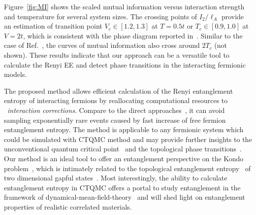 \documentclass[12pt,onecolumn,english,prl,showpacs,nofootinbib]{revtex4-1}
\begin{document}
Figure~\ref{fig:MI} shows the scaled mutual information versus interaction strength and temperature for several system sizes. The crossing points of $I_{2}/\ell_{A}$ provide an estimation of transition point $V_{c}\in[1.2, 1.3]$ at $T=0.5t$ or $T_{c}\in[0.9, 1.0]$ at $V=2t$, which is consistent with the phase diagram reported in~\cite{Gubernatis:1985wo}. Similar to the case of Ref.~\cite{Melko:2010jda, Iaconis:2013jz}, the curves of mutual information also cross around $2T_{c}$ (not shown). These results indicate that our approach can be a versatile tool to calculate the Renyi EE and detect phase transitions in the interacting fermionic models.  



%

The proposed method allows efficient calculation of the Renyi entanglement entropy of interacting fermions by reallocating computational resources to ~\emph{interaction corrections}. Compare to the direct approaches~\cite{Grover:2013cs, Broecker:2014ud}, it can avoid sampling exponentially rare events caused by fast increase of free fermion entanglement entropy. The method is applicable to any fermionic system which could be simulated with CTQMC method and may provide further insights to the unconventional quantum critical point~\cite{PhysRevX.3.031010, CTQMCpaper} and the topological phase transitions~\cite{Hohenadler:2011kk, Wang:2014vb, Anonymous:XiXakTeu}. Our method is an ideal tool to offer an entanglement perspective on the Kondo problem~\cite{Sorensen:2007eg,Sorensen:2007dn, PhysRevB.84.041107, PhysRevLett.109.066403}, which is intimately related to the topological entanglement entropy~\cite{Levin:2006ij, Kitaev:2006dn} of two dimensional gapful states~\cite{Fendley:2007gkc}. Most interestingly, the ability to calculate entanglement entropy in CTQMC offers a portal to study entanglement in the framework of dynamical-mean-field-theory~\cite{RevModPhys.68.13,Gull:2011jd} and will  shed light on entanglement properties of realistic correlated materials. %
\end{document}
